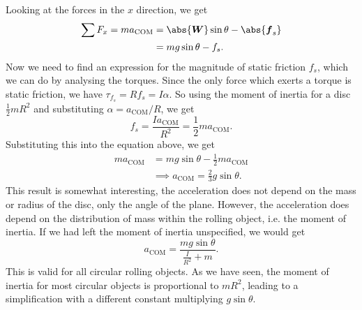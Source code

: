 \documentclass[../classical_mechanics.tex]{subfiles}
\begin{document}
\begin{example}
            Looking at the forces in the $x$ direction, we get
            \begin{align}
                \sum F_x=m a_\text{COM}&=\abs{\vec{W}}\sin\theta-\abs{\vec{f}_s}\\
                &=mg\sin\theta-f_s.
            \end{align}
            Now we need to find an expression for the magnitude of static friction $f_s$, which we can do by analysing the torques.
            Since the only force which exerts a torque is static friction, we have $\tau_{f_s}=Rf_s=I\alpha$.
            So using the moment of inertia for a disc $\frac{1}{2}mR^2$ and substituting $\alpha=a_\text{COM}/R$, we get
            \begin{equation}
                f_s=\frac{I a_\text{COM}}{R^2}=\frac{1}{2}ma_\text{COM}.
            \end{equation}
            Substituting this into the equation above, we get
            \begin{align}
                ma_\text{COM}&=mg\sin\theta-\frac{1}{2}ma_\text{COM}\\
                &\implies a_\text{COM}=\frac{2}{3}g\sin\theta.
            \end{align}
            This result is somewhat interesting, the acceleration does not depend on the mass or radius of the disc, only the angle of the plane.
            However, the acceleration does depend on the distribution of mass within the rolling object, i.e. the moment of inertia.
            If we had left the moment of inertia unspecified, we would get
            \begin{equation}
                a_\text{COM}=\frac{mg\sin\theta}{\frac{I}{R^2}+m}.
            \end{equation}
            This is valid for all circular rolling objects.
            As we have seen, the moment of inertia for most circular objects is proportional to $mR^2$, leading to a simplification with a different constant multiplying $g\sin\theta$.
        \end{example}
\end{document}
